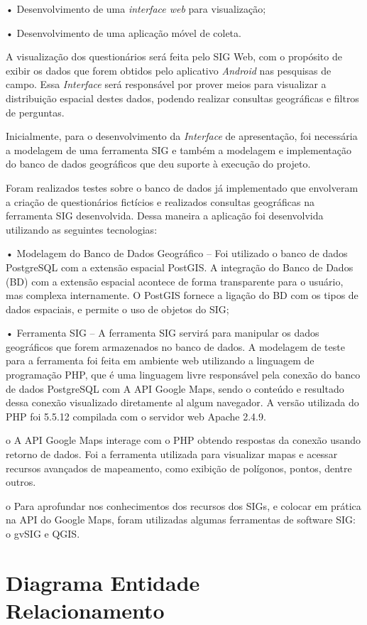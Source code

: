 \documentclass[
	12pt,				%
    oneside,			%
	a4paper,			%
	english,			%
	french,				%
	spanish,			%
	brazil,				%
	]{abntex2}
\begin{document}
•	Desenvolvimento de uma \textit{interface web} para visualização;

•	Desenvolvimento de uma aplicação móvel de coleta.


A visualização dos questionários será feita pelo SIG Web, com o propósito de exibir os dados que forem obtidos pelo aplicativo \textit{Android} nas pesquisas de campo. Essa \textit{Interface} será responsável por prover meios para visualizar a distribuição espacial destes dados, podendo realizar consultas geográficas e filtros de perguntas.

Inicialmente, para o desenvolvimento da \textit{Interface} de apresentação, foi necessária a modelagem de uma ferramenta SIG e também a modelagem e implementação do banco de dados geográficos que deu suporte à execução do projeto. 

Foram realizados testes sobre o banco de dados já implementado que envolveram a criação de questionários fictícios e realizados consultas geográficas na ferramenta SIG desenvolvida. Dessa maneira a aplicação foi desenvolvida utilizando as seguintes tecnologias:

•	Modelagem do Banco de Dados Geográfico – Foi utilizado o banco de dados PostgreSQL com a extensão espacial PostGIS. A integração do Banco de Dados (BD) com a extensão espacial acontece de forma transparente para o usuário, mas complexa internamente. O PostGIS fornece a ligação do BD com os tipos de dados espaciais, e permite o uso de objetos do SIG;

•	Ferramenta SIG – A ferramenta SIG servirá para manipular os dados geográficos que forem armazenados no banco de dados. A modelagem de teste para a ferramenta foi feita em ambiente web utilizando a linguagem de programação PHP, que é uma linguagem livre responsável pela conexão do banco de dados PostgreSQL com A API Google Maps, sendo o conteúdo e resultado dessa conexão visualizado diretamente al algum navegador. A versão utilizada do PHP foi 5.5.12 compilada com o servidor web Apache 2.4.9.

o	A API Google Maps interage com o PHP obtendo respostas da conexão usando retorno de dados. Foi a ferramenta utilizada para visualizar mapas e acessar recursos avançados de mapeamento, como exibição de polígonos, pontos, dentre outros.

o	Para aprofundar nos conhecimentos dos recursos dos SIGs, e colocar em prática na API do Google Maps, foram utilizadas algumas ferramentas de software SIG: o gvSIG e QGIS.


\section{Diagrama Entidade Relacionamento}
\end{document}
